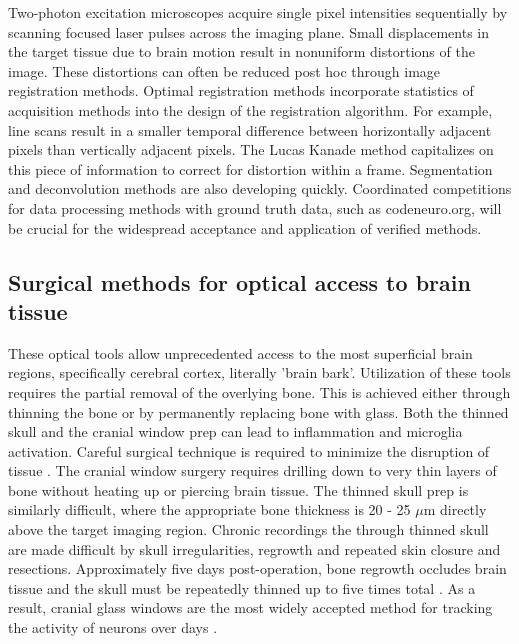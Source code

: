 Two-photon excitation microscopes acquire single pixel intensities sequentially by scanning focused laser pulses across the imaging plane. Small displacements in the target tissue due to brain motion result in nonuniform distortions of the image. These distortions can often be reduced post hoc through image registration methods. Optimal registration methods incorporate statistics of acquisition methods into the design of the registration algorithm. For example, line scans result in a smaller temporal difference between horizontally adjacent pixels than vertically adjacent pixels. The Lucas Kanade method capitalizes on this piece of information to correct for distortion within a frame. Segmentation and deconvolution methods are also developing quickly. Coordinated competitions for data processing methods with ground truth data, such as codeneuro.org, will be crucial for the widespread acceptance and application of verified methods.

\subsection{Surgical methods for optical access to brain tissue}
These optical tools allow unprecedented access to the most superficial brain regions, specifically cerebral cortex, literally 'brain bark'. Utilization of these tools requires the partial removal of the overlying bone. This is achieved either through thinning the bone or by permanently replacing bone with glass. Both the thinned skull and the cranial window prep can lead to inflammation and microglia activation. Careful surgical technique is required to minimize the disruption of tissue \citep{Dorand2014, Xu2007}. The cranial window surgery requires drilling down to very thin layers of bone without heating up or piercing brain tissue. The thinned skull prep is similarly difficult, where the appropriate bone thickness is 20 - 25 $\mu$m directly above the target imaging region. Chronic recordings the through thinned skull are made difficult by skull irregularities, regrowth and repeated skin closure and resections. Approximately five days post-operation, bone regrowth occludes  brain tissue and the skull must be repeatedly thinned up to five times total \citep{Yang2010}. As a result, cranial glass windows are the most widely accepted method for tracking the activity of neurons over days \citep{Goldey2014}.


